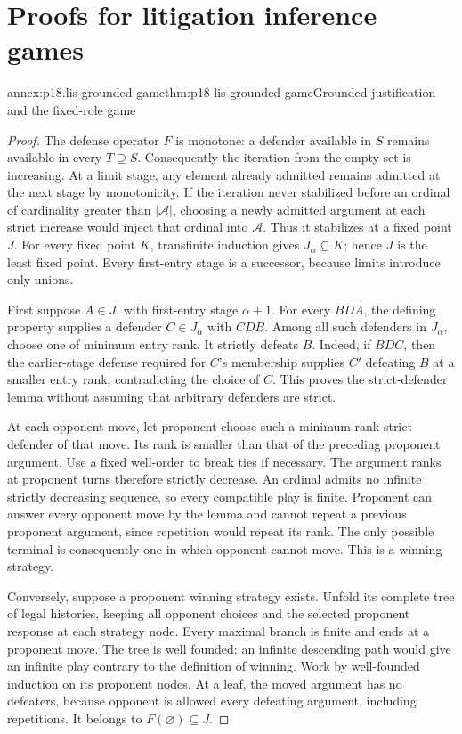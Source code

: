 \chapter{Proofs for litigation inference games}
\label{annex:p18-lis-burdens}

\begin{annexitem}{annex:p18.lis-grounded-game}{thm:p18-lis-grounded-game}{Grounded justification and the fixed-role game}
\begin{proof}
The defense operator \(F\) is monotone: a defender available in
\(S\) remains available in every \(T\supseteq S\).
Consequently the iteration from the empty set is increasing.
At a limit stage, any element already admitted remains admitted
at the next stage by monotonicity.
If the iteration never stabilized before an ordinal of cardinality
greater than \(|\mathcal A|\), choosing a newly admitted argument
at each strict increase would inject that ordinal into \(\mathcal A\).
Thus it stabilizes at a fixed point \(J\).
For every fixed point \(K\), transfinite induction gives
\(J_\alpha\subseteq K\); hence \(J\) is the least fixed point.
Every first-entry stage is a successor, because limits introduce
only unions.

First suppose \(A\in J\), with first-entry stage \(\alpha+1\).
For every \(BDA\), the defining property supplies a defender
\(C\in J_\alpha\) with \(CDB\).
Among all such defenders in \(J_\alpha\), choose one of minimum
entry rank. It strictly defeats \(B\).
Indeed, if \(BDC\), then the earlier-stage defense required for
\(C\)'s membership supplies \(C'\) defeating \(B\) at a smaller
entry rank, contradicting the choice of \(C\).
This proves the strict-defender lemma without assuming that
arbitrary defenders are strict.

At each opponent move, let proponent choose such a minimum-rank
strict defender of that move. Its rank is smaller than that of
the preceding proponent argument.
Use a fixed well-order to break ties if necessary.
The argument ranks at proponent turns therefore strictly decrease.
An ordinal admits no infinite strictly decreasing sequence, so
every compatible play is finite.
Proponent can answer every opponent move by the lemma and cannot
repeat a previous proponent argument, since repetition would repeat
its rank. The only possible terminal is consequently one in which
opponent cannot move. This is a winning strategy.

Conversely, suppose a proponent winning strategy exists.
Unfold its complete tree of legal histories, keeping all opponent
choices and the selected proponent response at each strategy node.
Every maximal branch is finite and ends at a proponent move.
The tree is well founded: an infinite descending path would give
an infinite play contrary to the definition of winning.
Work by well-founded induction on its proponent nodes.
At a leaf, the moved argument has no defeaters, because opponent
is allowed every defeating argument, including repetitions.
It belongs to \(F(\varnothing)\subseteq J\).


\end{proof}
\end{annexitem}
